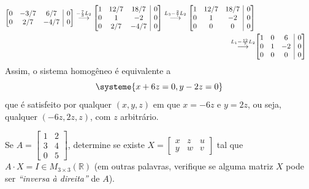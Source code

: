 \documentclass[12pt,a4paper]{article}
\makeatletter
\newcommand*\R{\mathbb{R}}
\newenvironment{amatrix}[1]{%
  \left[\begin{array}{@{}*{#1}{c}|c@{}}
}{%
  \end{array}\right]
}
\newcommand{\grstep}[2][\relax]{%
   \ensuremath{\mathrel{
       {\mathop{\longrightarrow}\limits^{#2\mathstrut}_{
                                     \begin{subarray}{l} #1 \end{subarray}}}}}}
\makeatother
\begin{document}
\begin{ExerciseList}
\begin{enumerate}
\begin{align*}
\begin{amatrix}{3}
 0& -3/7 & 6/7 & 0\\
 0&  2/7& -4/7& 0
\end{amatrix}
\grstep{ -\frac{7}{3} L_2 }
\begin{amatrix}{3}
 1&12/7&18/7& 0\\
 0& 1 & -2 & 0\\
 0&  2/7& -4/7& 0
\end{amatrix}
\grstep{ L_3 - \frac{2}{7} L_2 }
\begin{amatrix}{3}
 1&12/7&18/7& 0\\
 0& 1 & -2 & 0\\
 0& 0 & 0& 0
\end{amatrix}\\
\grstep{ L_1 - \frac{12}{7} L_2 }
&
\begin{amatrix}{3}
 1& 0 & 6 & 0\\
 0& 1 & -2 & 0\\
 0& 0 & 0& 0
\end{amatrix}
\end{align*}
Assim, o sistema homogêneo é equivalente a
\[
\systeme{
x + 6 z = 0,
y - 2 z = 0
}
\]
que é satisfeito por qualquer $(x, y, z)$ em que $x = -6z$ e $y = 2z$, ou seja, qualquer $(-6z, 2z, z)$, com $z$ arbitrário.
\end{enumerate}



\Exercise[title={1,8}] Se $A = \begin{bmatrix}
1 & 2\\3&4\\0&5
\end{bmatrix}$, determine se existe $X = \begin{bmatrix}
x&z&u\\y&w&v
\end{bmatrix}$ tal que $A \cdot X = I \in M_{3 \times 3} (\R)$ (em outras palavras, verifique se alguma matriz $X$ pode ser \emph{``inversa à direita''} de $A$).


\end{ExerciseList}
\end{document}
